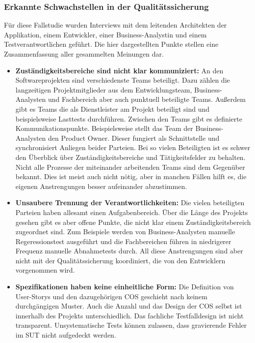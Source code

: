 \subsubsection{Erkannte Schwachstellen in der Qualitätssicherung}
\label{sec:schwachstellen_raiffeisen}
Für diese Fallstudie wurden Interviews mit dem leitenden Architekten der Applikation, einem Entwickler, einer Business-Analystin und einem Testverantwortlichen geführt. Die hier dargestellten Punkte stellen eine Zusammenfassung aller gesammelten Meinungen dar.\\
\begin{itemize}
\item \textbf{Zuständigkeitsbereiche sind nicht klar kommuniziert:} An den Softwareprojekten sind verschiedenste Teams beteiligt. Dazu zählen die langzeitigen Projektmitglieder aus dem Entwicklungsteam, Business-Analysten und Fachbereich aber auch punktuell beteiligte Teams. Außerdem gibt es Teams die als Dienstleister am Projekt beteiligt sind und beispielsweise Lasttests durchführen. Zwischen den Teams gibt es definierte Kommunikationspunkte. Beispielsweise stellt das Team der Business-Analysten den Product Owner. Dieser fungiert als Schnittstelle und synchronisiert Anliegen beider Parteien. Bei so vielen Beteiligten ist es schwer den Überblick über Zuständigkeitsbereiche und Tätigkeitsfelder zu behalten. Nicht alle Prozesse der miteinander arbeitenden Teams sind dem Gegenüber bekannt. Dies ist meist auch nicht nötig, aber in manchen Fällen hilft es, die eigenen Anstrengungen besser aufeinander abzustimmen.
\item \textbf{Unsaubere Trennung der Verantwortlichkeiten:} Die vielen beteiligten Parteien haben allesamt einen Aufgabenbereich. Über die Länge des Projekts gesehen gibt es aber offene Punkte, die nicht klar einem Zuständigkeitsbereich zugeordnet sind. Zum Beispiele werden von Business-Analysten manuelle Regeressionstest ausgeführt und die Fachbereichen führen in niedrigerer Frequenz manuelle Abnahmetests durch. All diese Anstrengungen sind aber nicht mit der Qualitätssicherung koordiniert, die von den Entwicklern vorgenommen wird.
\item \textbf{Spezifikationen haben keine einheitliche Form:} Die Definition von User-Storys und den dazugehörigen \Gls{COS} geschieht nach keinem durchgängigen Muster. Auch die Anzahl und das Design der \Gls{COS} selbst ist innerhalb des Projekts unterschiedlich. Das fachliche Testfalldesign ist nicht transparent. Unsystematische Tests können zulassen, dass gravierende Fehler im \Gls{SUT} nicht aufgedeckt werden.
\end{itemize}

